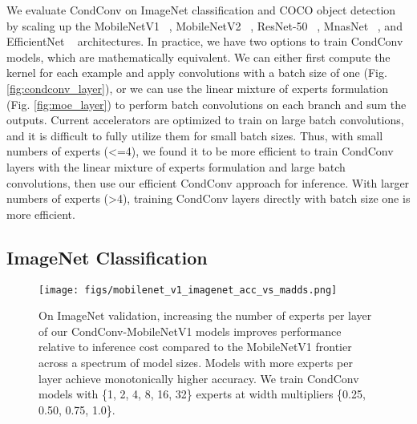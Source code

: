 \documentclass{article}
\def\codename{CondConv}
\begin{document}
We evaluate \codename{} on ImageNet classification and COCO object detection by scaling up the MobileNetV1 ~\cite{howard2017mobilenets}, MobileNetV2 ~\cite{sandler2018mobilenetv2}, ResNet-50 ~\cite{he2016deep}, MnasNet ~\cite{tan2018mnasnet}, and EfficientNet ~\cite{tan2019efficientnet} architectures. In practice, we have two options to train \codename{} models, which are mathematically equivalent. We can either first compute the kernel for each example and apply convolutions with a batch size of one (Fig. \ref{fig:condconv_layer}), or we can use the linear mixture of experts formulation (Fig. \ref{fig:moe_layer}) to perform batch convolutions on each branch and sum the outputs. Current accelerators are optimized to train on large batch convolutions, and it is difficult to fully utilize them for small batch sizes. Thus, with small numbers of experts (<=4), we found it to be more efficient to train \codename{} layers with the linear mixture of experts formulation and large batch convolutions, then use our efficient \codename{} approach for inference. With larger numbers of experts (>4), training \codename{} layers directly with batch size one is more efficient.

\subsection{ImageNet Classification}

\begin{figure}[t]
\centering
\texttt{[image: figs/mobilenet\_v1\_imagenet\_acc\_vs\_madds.png]}
\caption{On ImageNet validation, increasing the number of experts per layer of our \codename{}-MobileNetV1 models improves performance relative to inference cost compared to the MobileNetV1 frontier~\cite{slim2016} across a spectrum of model sizes. Models with more experts per layer achieve monotonically higher accuracy. We train \codename{} models with \{1, 2, 4, 8, 16, 32\} experts at width multipliers \{0.25, 0.50, 0.75, 1.0\}.}
\label{fig:ccmv1v1_acc_madds}
\end{figure}
\end{document}
